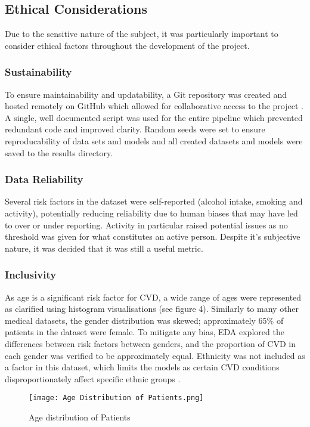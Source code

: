 \documentclass[conference]{IEEEtran}
\begin{document}
\subsection{Ethical Considerations}
Due to the sensitive nature of the subject, it was particularly important to consider ethical factors throughout the development of the project.
\subsubsection{Sustainability}
To ensure maintainability and updatability, a Git repository was created and hosted remotely on GitHub which allowed for collaborative access to the project \cite{GIT}. A single, well documented script was used for the entire pipeline which prevented redundant code and improved clarity. Random seeds were set to ensure reproducability of data sets and models and all created datasets and models were saved to the results directory. 
\subsubsection{Data Reliability}
Several risk factors in the dataset were self-reported (alcohol intake, smoking and activity), potentially reducing reliability due to human biases that may have led to over or under reporting. Activity in particular raised potential issues as no threshold was given for what constitutes an active person. Despite it's subjective nature, it was decided that it was still a useful metric. 
\subsubsection{Inclusivity} %
As age is a significant risk factor for CVD, a wide range of ages were represented as clarified using histogram visualisations (see figure 4). Similarly to many other medical datasets, the gender distribution was skewed\cite{GENDER}; approximately 65\% of patients in the dataset were female. To mitigate any bias, EDA explored the differences between risk factors between genders, and the proportion of CVD in each gender was verified to be approximately equal. Ethnicity was not included as a factor in this dataset, which limits the models as certain CVD conditions disproportionately affect specific ethnic groups \cite{ETHNICITY}. 
\begin{figure}[htbp]
\centerline{\texttt{[image: Age Distribution of Patients.png]}}
\caption{Age distribution of Patients}
\label{fig}
\end{figure}
\end{document}
